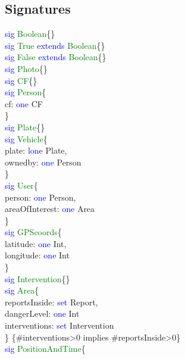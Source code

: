 \subsection{Signatures}
\textcolor{blue}{sig}
\textcolor{green}{Boolean}\{\} \\
\textcolor{blue}{sig}
\textcolor{green}{True}
\textcolor{blue}{extends}
\textcolor{green}{Boolean}\{\} \\ 
\textcolor{blue}{sig}
\textcolor{green}{False}
\textcolor{blue}{extends}
\textcolor{green}{Boolean}\{\} \\
\textcolor{blue}{sig}
\textcolor{green}{Photo}\{\} \\
\textcolor{blue}{sig}
\textcolor{green}{CF}\{\} \\
\textcolor{blue}{sig}
\textcolor{green}{Person}\{ \\
cf: \textcolor{blue}{one} CF\\
\} \\
\textcolor{blue}{sig}
\textcolor{green}{Plate}\{\} \\
\textcolor{blue}{sig}
\textcolor{green}{Vehicle}\{ \\
plate: \textcolor{blue}{lone} Plate,\\
ownedby: \textcolor{blue}{one} Person\\
\} \\
\textcolor{blue}{sig}
\textcolor{green}{User}\{ \\
person: \textcolor{blue}{one} Person,\\
areaOfInterest: \textcolor{blue}{one} Area\\ 
\} \\
\textcolor{blue}{sig}
\textcolor{green}{GPScoords}\{ \\
latitude: \textcolor{blue}{one} Int,\\
longitude: \textcolor{blue}{one} Int\\ 
\} \\
\textcolor{blue}{sig}
\textcolor{green}{Intervention}\{\} \\
\textcolor{blue}{sig}
\textcolor{green}{Area}\{ \\
reportsInside: \textcolor{blue}{set} Report,\\
dangerLevel: \textcolor{blue}{one} Int\\ 
interventions: \textcolor{blue}{set} Intervention\\
\} \{\#interventions>0 implies \#reportsInside>0\}\\
\textcolor{blue}{sig}
\textcolor{green}{PositionAndTime}\{ \\
